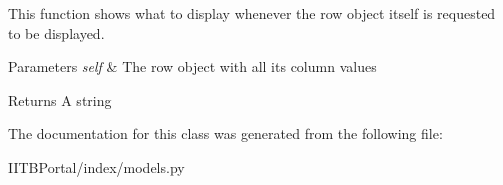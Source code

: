 This function shows what to display whenever the row object itself is requested to be displayed. 


\begin{DoxyParams}{Parameters}
{\em self} & The row object with all its column values \\
\hline
\end{DoxyParams}
\begin{DoxyReturn}{Returns}
A string 
\end{DoxyReturn}


The documentation for this class was generated from the following file\+:\begin{DoxyCompactItemize}
\item 
I\+I\+T\+B\+Portal/index/models.\+py\end{DoxyCompactItemize}

